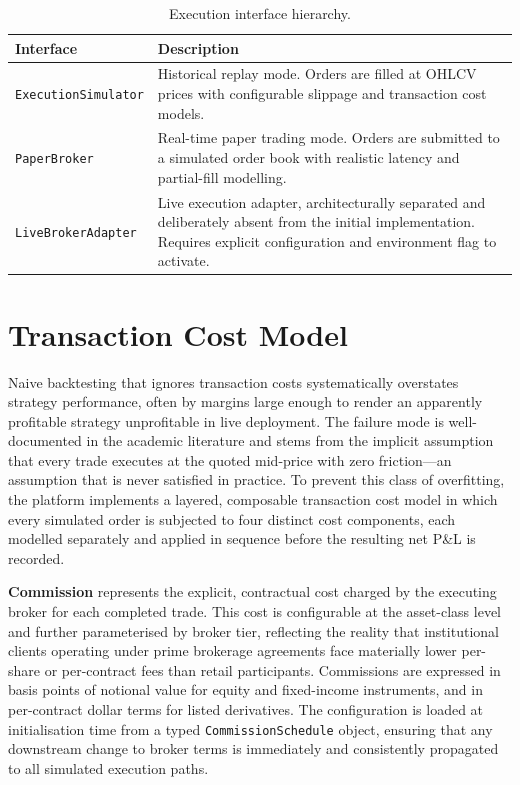\documentclass[12pt,openany]{book}
\numberwithin{equation}{chapter}
\theoremstyle{plain}
\theoremstyle{definition}
\theoremstyle{remark}
\begin{document}
\begin{table}[H]
\centering
\caption{Execution interface hierarchy.}
\label{tab:exec_hierarchy}
\small
\begin{tabularx}{\textwidth}{p{4.5cm} p{10.0cm}}
\toprule
\textbf{Interface} & \textbf{Description} \\
\midrule
\texttt{ExecutionSimulator} &
    Historical replay mode. Orders are filled at OHLCV prices with
    configurable slippage and transaction cost models. \\
\midrule
\texttt{PaperBroker} &
    Real-time paper trading mode. Orders are submitted to a
    simulated order book with realistic latency and partial-fill modelling. \\
\midrule
\texttt{LiveBrokerAdapter} &
    Live execution adapter, architecturally separated and deliberately
    absent from the initial implementation. Requires explicit configuration
    and environment flag to activate. \\
\bottomrule
\end{tabularx}
\end{table}

\section{Transaction Cost Model}

Naive backtesting that ignores transaction costs systematically overstates strategy performance, often by margins large enough to render an apparently profitable strategy unprofitable in live deployment. The failure mode is well-documented in the academic literature and stems from the implicit assumption that every trade executes at the quoted mid-price with zero friction---an assumption that is never satisfied in practice. To prevent this class of overfitting, the platform implements a layered, composable transaction cost model in which every simulated order is subjected to four distinct cost components, each modelled separately and applied in sequence before the resulting net P\&L is recorded.

\textbf{Commission} represents the explicit, contractual cost charged by the executing broker for each completed trade. This cost is configurable at the asset-class level and further parameterised by broker tier, reflecting the reality that institutional clients operating under prime brokerage agreements face materially lower per-share or per-contract fees than retail participants. Commissions are expressed in basis points of notional value for equity and fixed-income instruments, and in per-contract dollar terms for listed derivatives. The configuration is loaded at initialisation time from a typed \texttt{CommissionSchedule} object, ensuring that any downstream change to broker terms is immediately and consistently propagated to all simulated execution paths.
\end{document}
